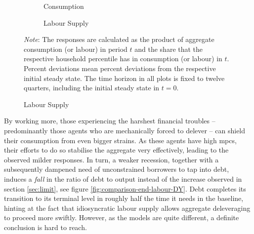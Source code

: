 \documentclass[a4paper,12pt]{article} %
\numberwithin{equation}{section} %
\numberwithin{figure}{section}
\numberwithin{table}{section}
\begin{document}
\begin{figure}[t]
    \centering
    \caption{Endogenous Labour Model -- Shock to Borrowing Limit: \\ Consumption and Labour Responses by Percentiles}
    \label{fig:end-L-permanent-limit-percentiles}
    \begin{subfigure}[b]{0.49\textwidth}
    \caption{Consumption}
    \label{fig:end-L-permanent-limit-percentiles-c}
         \centering
         
     \end{subfigure}
     \hfill
    \begin{subfigure}[b]{0.49\textwidth}
    \caption{Labour Supply}
    \label{fig:end-L-permanent-limit-percentiles-n}
         \centering
         
     \end{subfigure}
     
     \vspace{10pt}
     
     \justifying
     \footnotesize
	\textit{Note}: The responses are calculated as the product of aggregate consumption (or labour) in period $t$ and the share that the respective household percentile has in consumption (or labour) in $t$. Percent deviations mean percent deviations from the respective initial steady state. The time horizon in all plots is fixed to twelve quarters, including the initial steady state in $t=0$.
\end{figure}

By working more, those experiencing the harshest financial troubles -- predominantly those agents who are mechanically forced to delever -- can shield their consumption from even bigger strains. As these agents have high \Gls{mpc}s, their efforts to do so stabilise the aggregate very effectively, leading to the observed milder responses. In turn, a weaker recession, together with a subsequently dampened need of unconstrained borrowers to tap into debt, induces a \textit{fall} in the ratio of debt to output instead of the increase observed in section \ref{sec:limit}, see figure \ref{fig:comparison-end-labour-DY}. Debt completes its transition to its terminal level in roughly half the time it needs in the baseline, hinting at the fact that idiosyncratic labour supply allows aggregate deleveraging to proceed more swiftly. However, as the models are quite different, a definite conclusion is hard to reach.
\end{document}
